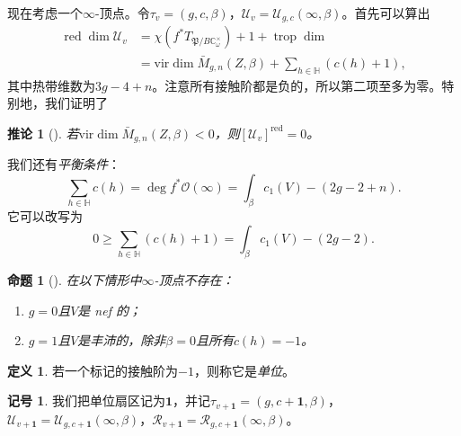 \documentclass{amsart}
\newtheorem{cor}[thm]{推论}
\newtheorem{prop}[thm]{命题}
\theoremstyle{definition}
\newtheorem{defn}[thm]{定义}
\newtheorem{notn}[thm]{记号}
\theoremstyle{remark}
\theoremstyle{plain}
\theoremstyle{definition}
\theoremstyle{remark}
\newcommand{\C}{\mathbb{C}}
\renewcommand{\H}{\mathbb{H}}
\newcommand{\mc}[1]{\mathcal{#1}}
\newcommand{\mf}[1]{\mathfrak{#1}}
\newcommand{\mr}[1]{\mathrm{#1}}
\newcommand{\on}[1]{\operatorname{#1}}
\newcommand{\1}{\mathbf{1}}
\newcommand{\2}{\mathbf{2}}
\newcommand{\3}{\mathbf{3}}
\newcommand{\vir}{\mr{vir}}
\begin{document}
现在考虑一个\(\infty\)-顶点。令\(\tau_v = (g, c, \beta)\)，\(\mc{U}_v = \mc{U}_{g,c}(\infty, \beta)\)。首先可以算出
\begin{align*}
    \on{red}\dim \mc{U}_v &= \chi(f^* T_{\mf{P}/B \C^{\times}_{\omega}}) + 1 + \on{trop}\dim  \\
    &= \vir\dim \bar{M}_{g,n}(Z, \beta) + \sum_{h \in \H } (c(h) + 1),
\end{align*}
其中热带维数为\(3g-4+n\)。注意所有接触阶都是负的，所以第二项至多为零。特别地，我们证明了
\begin{cor}[{\cite{CJRpunctured}}]
    若\(\vir\dim \bar{M}_{g,n}(Z,\beta) < 0\)，则\([\mc{U}_v]^{\on{red}} = 0\)。
\end{cor}
我们还有\textit{平衡条件}：
\begin{equation}\label{eqn:balancing condition}
    \sum_{h \in \H} c(h) = \deg f^* \mc{O}(\infty) = \int_{\beta} c_1(V) - (2g-2+n).
\end{equation}
它可以改写为
\[ 0 \geq \sum_{h \in \H} (c(h)+1) = \int_{\beta} c_1(V) - (2g-2). \]
\begin{prop}[{\cite{CJRpunctured}}]
    在以下情形中\(\infty\)-顶点不存在：
    \begin{enumerate}
        \item \(g = 0\)且\(V\)是 nef 的；
        \item \(g=1\)且\(V\)是丰沛的，除非\(\beta = 0\)且所有\(c(h) = -1\)。
    \end{enumerate}
\end{prop}

\begin{defn}
    若一个标记的接触阶为\(-1\)，则称它是\textit{单位}。
\end{defn}

\begin{notn}
    我们把单位扇区记为\(\1\)，并记\(\tau_{v+\1} = (g, c+\1, \beta)\)，\(\mc{U}_{v+\1} = \mc{U}_{g, c+\1}(\infty, \beta)\)，\(\mc{R}_{v+\1} = \mc{R}_{g, c+\1}(\infty, \beta)\)。
\end{notn}
\end{document}
